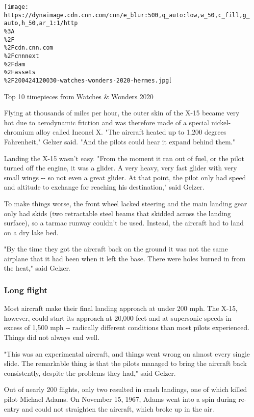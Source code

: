 \href{/style/article/watches-wonders-2020-luxury-watches/index.html}{}

\texttt{[image: https://dynaimage.cdn.cnn.com/cnn/e\_blur:500,q\_auto:low,w\_50,c\_fill,g\_auto,h\_50,ar\_1:1/http\\\%3A\\\%2F\\\%2Fcdn.cnn.com\\\%2Fcnnnext\\\%2Fdam\\\%2Fassets\\\%2F200424120030-watches-wonders-2020-hermes.jpg]}

Top 10 timepieces from Watches \& Wonders 2020

Flying at thousands of miles per hour, the outer skin of the X-15 became
very hot due to aerodynamic friction and was therefore made of a special
nickel-chromium alloy called Inconel X. "The aircraft heated up to 1,200
degrees Fahrenheit," Gelzer said. "And the pilots could hear it expand
behind them."

Landing the X-15 wasn't easy. "From the moment it ran out of fuel, or
the pilot turned off the engine, it was a glider. A very heavy, very
fast glider with very small wings -\/- so not even a great glider. At
that point, the pilot only had speed and altitude to exchange for
reaching his destination," said Gelzer.

To make things worse, the front wheel lacked steering and the main
landing gear only had skids (two retractable steel beams that skidded
across the landing surface), so a tarmac runway couldn't be used.
Instead, the aircraft had to land on a dry lake bed.

"By the time they got the aircraft back on the ground it was not the
same airplane that it had been when it left the base. There were holes
burned in from the heat," said Gelzer.

\hypertarget{long-flight}{%
\subsubsection{Long flight}\label{long-flight}}

Most aircraft make their final landing approach at under 200 mph. The
X-15, however, could start its approach at 20,000 feet and at supersonic
speeds in excess of 1,500 mph -\/- radically different conditions than
most pilots experienced. Things did not always end well.

"This was an experimental aircraft, and things went wrong on almost
every single slide. The remarkable thing is that the pilots managed to
bring the aircraft back consistently, despite the problems they had,"
said Gelzer.

Out of nearly 200 flights, only two resulted in crash landings, one of
which killed pilot Michael Adams. On November 15, 1967, Adams went into
a spin during re-entry and could not straighten the aircraft, which
broke up in the air.

